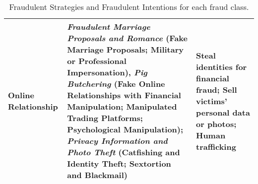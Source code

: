 \begin{table*}[!ht]
\begin{tabular}{p{3cm} p{8cm} p{3cm}}
    \midrule
    \textbf{Online Relationship} & \textit{Fraudulent Marriage Proposals and Romance} (Fake Marriage Proposals; Military or Professional Impersonation), \textit{Pig Butchering} (Fake Online Relationships with Financial Manipulation; Manipulated Trading Platforms; Psychological Manipulation); \textit{Privacy Information and Photo Theft} (Catfishing and Identity Theft; Sextortion and Blackmail) & Steal identities for financial fraud; Sell victims' personal data or photos; Human trafficking\\  
    \bottomrule
\end{tabular}
\caption{Fraudulent Strategies and Fraudulent Intentions for each fraud class.}
\label{tab:fiandfs}
\end{table*}
